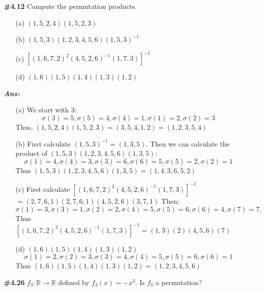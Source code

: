 \documentclass[12pt]{article}
\newcommand{\sol}{\setlength{\parindent}{0cm}\textbf{\textit{Ans:}}\setlength{\parindent}{1cm} }
\begin{document}
\begin{enumerate}[start=1,label={\bfseries Question \arabic*:},leftmargin=1in] %
  \item[\textbf{\#4.12}] Compute the permutation products.
  \begin{enumerate}
      \item[(a)] \( (1, 5, 2, 4)(1, 5, 2, 3) \)
      \item[(b)] \( (1, 5, 3)(1, 2, 3, 4, 5, 6)(1, 5, 3)^{-1} \)
      \item[(c)] \( [(1, 6, 7, 2)^2 (4, 5, 2, 6)^{-1} (1, 7, 3)]^{-1} \)
      \item[(d)] \( (1, 6)(1, 5)(1, 4)(1, 3)(1, 2) \)
  \end{enumerate}
  \sol{}
  \begin{enumerate}
    \item[(a)] We start with 3:
    \[\sigma(3) = 5, 
      \sigma(5) = 4, 
      \sigma(4) = 1, 
      \sigma(1) = 2, 
      \sigma(2) = 3
    \]
    Thus, \( (1, 5, 2, 4)(1, 5, 2, 3) = (3, 5, 4, 1, 2) = (1, 2, 3, 5, 4) \)
    \item[(b)] First calculate \( (1, 5, 3)^{-1} = (1, 3, 5) \). Then we can calculate the product of \( (1, 5, 3)(1, 2, 3, 4, 5, 6)(1, 3, 5) \):
    \[\sigma(1) = 4, 
    \sigma(4) = 3, 
    \sigma(3) = 6,
    \sigma(6) = 5, 
    \sigma(5) = 2,
    \sigma(2) = 1 
    \]
    Thus \( (1, 5, 3)(1, 2, 3, 4, 5, 6)(1, 3, 5) = (1, 4, 3, 6, 5, 2) \)
    \item[(c)] First calculate \( [(1, 6, 7, 2)^2 (4, 5, 2, 6)^{-1} (1, 7, 3)]^{-1}\) \\
    \( = (2, 7, 6, 1)(2, 7, 6, 1)(4, 5, 2, 6)(3, 7, 1) \) Then:
    \[\sigma(1) = 3,
    \sigma(3) = 1,
    \sigma(2) = 2,
    \sigma(4) = 5,
    \sigma(5) = 6,
    \sigma(6) = 4,
    \sigma(7) = 7,
    \]
    Thus \( [(1, 6, 7, 2)^2 (4, 5, 2, 6)^{-1} (1, 7, 3)]^{-1} = (1, 3)(2)(4, 5, 6)(7) \)
    \item[(d)] \( (1, 6)(1, 5)(1, 4)(1, 3)(1, 2) \)
    \[
    \sigma(1) = 2,
    \sigma(2) = 3,
    \sigma(3) = 4,
    \sigma(4) = 5,
    \sigma(5) = 6,
    \sigma(6) = 1
    \]
    Thus \( (1, 6)(1, 5)(1, 4)(1, 3)(1, 2) = (1, 2, 3, 4, 5, 6) \)
  \end{enumerate}
  \item[\textbf{\#4.26}] \( f_3 : \mathbb{R} \to \mathbb{R} \) defined by \( f_3(x) = -x^3 \). Is $f_3$ a permutation?\\

\end{enumerate}
\end{document}
